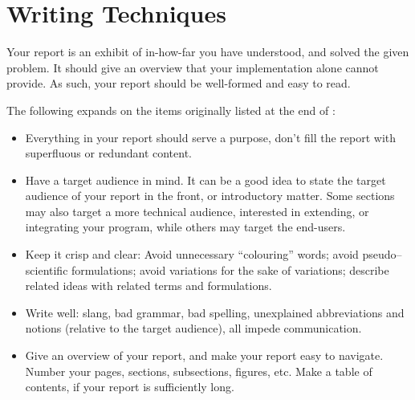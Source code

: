 \section{Writing Techniques}

\label{sec:writing-techniques}

Your report is an exhibit of in-how-far you have understood, and solved the
given problem. It should give an overview that your implementation alone cannot
provide. As such, your report should be well-formed and easy to read.

The following expands on the items originally listed at the end of
\cite{sestoft2002}:

\begin{itemize}

\item Everything in your report should serve a purpose, don't fill the report
with superfluous or redundant content.

\item Have a target audience in mind. It can be a good idea to state the target
audience of your report in the front, or introductory matter. Some sections may
also target a more technical audience, interested in extending, or integrating
your program, while others may target the end-users.

\item Keep it crisp and clear: Avoid unnecessary ``colouring'' words; avoid
pseudo–scientific formulations; avoid variations for the sake of variations;
describe related ideas with related terms and formulations.

\item Write well: slang, bad grammar, bad spelling, unexplained abbreviations
and notions (relative to the target audience), all impede communication.

\item Give an overview of your report, and make your report easy to navigate.
Number your pages, sections, subsections, figures, etc. Make a table of
contents, if your report is sufficiently long.

\end{itemize}
